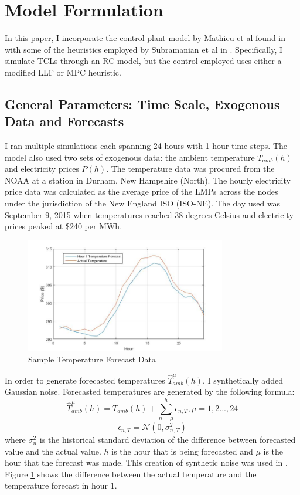 \documentclass[journal]{IEEEtran}
\begin{document}
\section {Model Formulation}
In this paper, I incorporate the control plant model by Mathieu et al found in \cite{mat} with some of the heuristics employed by Subramanian et al in \cite{sub}. Specifically, I simulate TCLs through an RC-model, but the control employed uses either a modified LLF or MPC heuristic.

\subsection{General Parameters: Time Scale, Exogenous Data and Forecasts}
I ran multiple simulations each spanning 24 hours with 1 hour time steps. The model also used two sets of exogenous data: the ambient temperature \({T_{amb}(h)}\) and electricity prices \({P(h)}\). The temperature data was procured from the NOAA at a station in Durham, New Hampshire (North). The hourly electricity price data was calculated as the average price of the LMPs across the nodes under the jurisdiction of the New England ISO (ISO-NE). The day used was September 9, 2015 when temperatures reached 38 degrees Celsius and electricity prices peaked at \$240 per MWh.

\begin{figure}[b]
\centering
\includegraphics[width=\linewidth, height=5cm]{"tempfig"}
\caption[]{Sample Temperature Forecast Data}
\label{fig:temp}
\end{figure}

In order to generate forecasted temperatures \(\hat{T}_{amb}^{\mu}(h)\), I synthetically added Gaussian noise. Forecasted temperatures are generated by the following formula:
\[ \hat{T}_{amb}^{\mu}(h)=T_{amb}(h)+\sum_{n=\mu}^{h}\epsilon_{n,T}, \mu=1,2...,24\]
\[\epsilon_{n,T} = \mathcal N (0, \sigma_{n,T}^2)\]
where \(\sigma_{n}^2\) is the historical standard deviation of the difference between forecasted value and the actual value. \(h\) is the hour that is being forecasted and \(\mu\) is the hour that the forecast was made. This creation of synthetic noise was used in \cite{sub}. Figure \ref{fig:temp} shows the difference between the actual temperature and the temperature forecast in hour 1.
\end{document}
